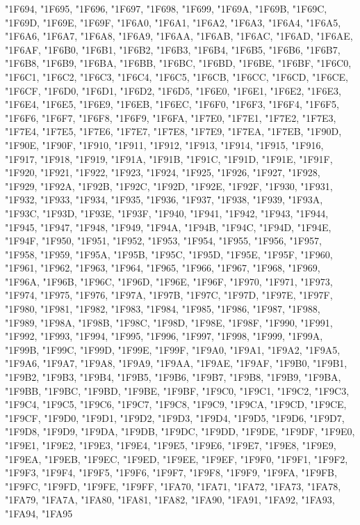 {"1F694,
"1F695,
"1F696,
"1F697,
"1F698,
"1F699,
"1F69A,
"1F69B,
"1F69C,
"1F69D,
"1F69E,
"1F69F,
"1F6A0,
"1F6A1,
"1F6A2,
"1F6A3,
"1F6A4,
"1F6A5,
"1F6A6,
"1F6A7,
"1F6A8,
"1F6A9,
"1F6AA,
"1F6AB,
"1F6AC,
"1F6AD,
"1F6AE,
"1F6AF,
"1F6B0,
"1F6B1,
"1F6B2,
"1F6B3,
"1F6B4,
"1F6B5,
"1F6B6,
"1F6B7,
"1F6B8,
"1F6B9,
"1F6BA,
"1F6BB,
"1F6BC,
"1F6BD,
"1F6BE,
"1F6BF,
"1F6C0,
"1F6C1,
"1F6C2,
"1F6C3,
"1F6C4,
"1F6C5,
"1F6CB,
"1F6CC,
"1F6CD,
"1F6CE,
"1F6CF,
"1F6D0,
"1F6D1,
"1F6D2,
"1F6D5,
"1F6E0,
"1F6E1,
"1F6E2,
"1F6E3,
"1F6E4,
"1F6E5,
"1F6E9,
"1F6EB,
"1F6EC,
"1F6F0,
"1F6F3,
"1F6F4,
"1F6F5,
"1F6F6,
"1F6F7,
"1F6F8,
"1F6F9,
"1F6FA,
"1F7E0,
"1F7E1,
"1F7E2,
"1F7E3,
"1F7E4,
"1F7E5,
"1F7E6,
"1F7E7,
"1F7E8,
"1F7E9,
"1F7EA,
"1F7EB,
"1F90D,
"1F90E,
"1F90F,
"1F910,
"1F911,
"1F912,
"1F913,
"1F914,
"1F915,
"1F916,
"1F917,
"1F918,
"1F919,
"1F91A,
"1F91B,
"1F91C,
"1F91D,
"1F91E,
"1F91F,
"1F920,
"1F921,
"1F922,
"1F923,
"1F924,
"1F925,
"1F926,
"1F927,
"1F928,
"1F929,
"1F92A,
"1F92B,
"1F92C,
"1F92D,
"1F92E,
"1F92F,
"1F930,
"1F931,
"1F932,
"1F933,
"1F934,
"1F935,
"1F936,
"1F937,
"1F938,
"1F939,
"1F93A,
"1F93C,
"1F93D,
"1F93E,
"1F93F,
"1F940,
"1F941,
"1F942,
"1F943,
"1F944,
"1F945,
"1F947,
"1F948,
"1F949,
"1F94A,
"1F94B,
"1F94C,
"1F94D,
"1F94E,
"1F94F,
"1F950,
"1F951,
"1F952,
"1F953,
"1F954,
"1F955,
"1F956,
"1F957,
"1F958,
"1F959,
"1F95A,
"1F95B,
"1F95C,
"1F95D,
"1F95E,
"1F95F,
"1F960,
"1F961,
"1F962,
"1F963,
"1F964,
"1F965,
"1F966,
"1F967,
"1F968,
"1F969,
"1F96A,
"1F96B,
"1F96C,
"1F96D,
"1F96E,
"1F96F,
"1F970,
"1F971,
"1F973,
"1F974,
"1F975,
"1F976,
"1F97A,
"1F97B,
"1F97C,
"1F97D,
"1F97E,
"1F97F,
"1F980,
"1F981,
"1F982,
"1F983,
"1F984,
"1F985,
"1F986,
"1F987,
"1F988,
"1F989,
"1F98A,
"1F98B,
"1F98C,
"1F98D,
"1F98E,
"1F98F,
"1F990,
"1F991,
"1F992,
"1F993,
"1F994,
"1F995,
"1F996,
"1F997,
"1F998,
"1F999,
"1F99A,
"1F99B,
"1F99C,
"1F99D,
"1F99E,
"1F99F,
"1F9A0,
"1F9A1,
"1F9A2,
"1F9A5,
"1F9A6,
"1F9A7,
"1F9A8,
"1F9A9,
"1F9AA,
"1F9AE,
"1F9AF,
"1F9B0,
"1F9B1,
"1F9B2,
"1F9B3,
"1F9B4,
"1F9B5,
"1F9B6,
"1F9B7,
"1F9B8,
"1F9B9,
"1F9BA,
"1F9BB,
"1F9BC,
"1F9BD,
"1F9BE,
"1F9BF,
"1F9C0,
"1F9C1,
"1F9C2,
"1F9C3,
"1F9C4,
"1F9C5,
"1F9C6,
"1F9C7,
"1F9C8,
"1F9C9,
"1F9CA,
"1F9CD,
"1F9CE,
"1F9CF,
"1F9D0,
"1F9D1,
"1F9D2,
"1F9D3,
"1F9D4,
"1F9D5,
"1F9D6,
"1F9D7,
"1F9D8,
"1F9D9,
"1F9DA,
"1F9DB,
"1F9DC,
"1F9DD,
"1F9DE,
"1F9DF,
"1F9E0,
"1F9E1,
"1F9E2,
"1F9E3,
"1F9E4,
"1F9E5,
"1F9E6,
"1F9E7,
"1F9E8,
"1F9E9,
"1F9EA,
"1F9EB,
"1F9EC,
"1F9ED,
"1F9EE,
"1F9EF,
"1F9F0,
"1F9F1,
"1F9F2,
"1F9F3,
"1F9F4,
"1F9F5,
"1F9F6,
"1F9F7,
"1F9F8,
"1F9F9,
"1F9FA,
"1F9FB,
"1F9FC,
"1F9FD,
"1F9FE,
"1F9FF,
"1FA70,
"1FA71,
"1FA72,
"1FA73,
"1FA78,
"1FA79,
"1FA7A,
"1FA80,
"1FA81,
"1FA82,
"1FA90,
"1FA91,
"1FA92,
"1FA93,
"1FA94,
"1FA95}

